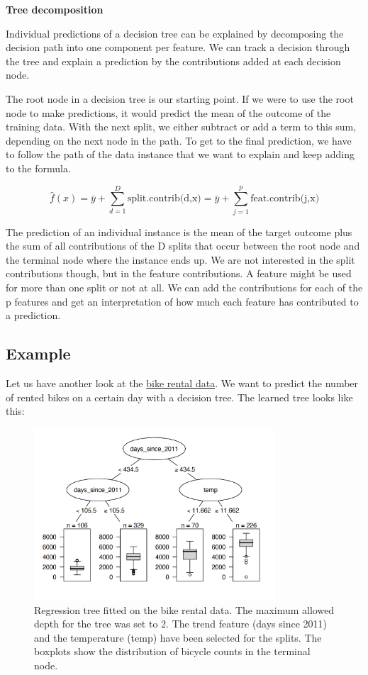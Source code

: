\documentclass[
  11pt,
]{scrbook}
\begin{document}
\textbf{Tree decomposition}

Individual predictions of a decision tree can be explained by decomposing the decision path into one component per feature.
We can track a decision through the tree and explain a prediction by the contributions added at each decision node.

The root node in a decision tree is our starting point.
If we were to use the root node to make predictions, it would predict the mean of the outcome of the training data.
With the next split, we either subtract or add a term to this sum, depending on the next node in the path.
To get to the final prediction, we have to follow the path of the data instance that we want to explain and keep adding to the formula.

\[\hat{f}(x)=\bar{y}+\sum_{d=1}^D\text{split.contrib(d,x)}=\bar{y}+\sum_{j=1}^p\text{feat.contrib(j,x)}\]

The prediction of an individual instance is the mean of the target outcome plus the sum of all contributions of the D splits that occur between the root node and the terminal node where the instance ends up.
We are not interested in the split contributions though, but in the feature contributions.
A feature might be used for more than one split or not at all.
We can add the contributions for each of the p features and get an interpretation of how much each feature has contributed to a prediction.

\hypertarget{example-2}{%
\subsection{Example}\label{example-2}}

Let us have another look at the \protect\hyperlink{bike-data}{bike rental data}.
We want to predict the number of rented bikes on a certain day with a decision tree.
The learned tree looks like this:

\begin{figure}

{\centering \includegraphics[width=0.8\textwidth]{images/tree-example-1} 

}

\caption{Regression tree fitted on the bike rental data. The maximum allowed depth for the tree was set to 2. The trend feature (days since 2011) and the temperature (temp) have been selected for the splits. The boxplots show the distribution of bicycle counts in the terminal node.}\label{fig:tree-example}
\end{figure}
\end{document}
